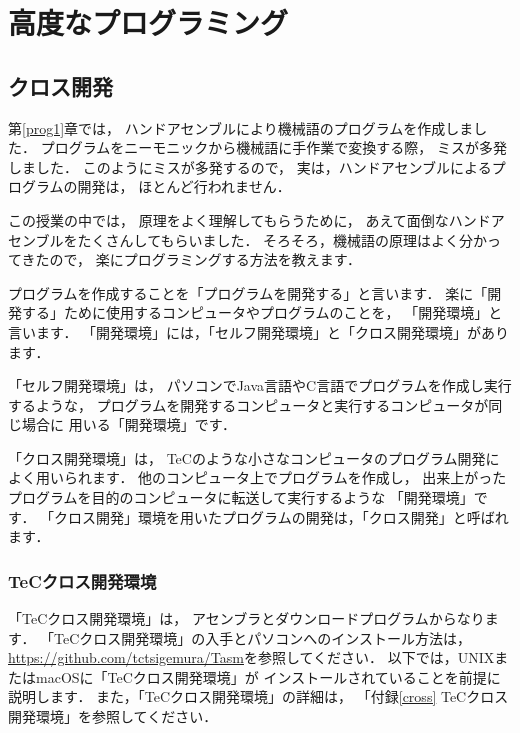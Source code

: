\renewcommand{\myincludegraphics}[2]{\texttt{[image: chap6/\#1]}}

\chapter{高度なプログラミング\label{prog2}}

\section{クロス開発}

第\ref{prog1}章では，
ハンドアセンブルにより機械語のプログラムを作成しました．
プログラムをニーモニックから機械語に手作業で変換する際，
ミスが多発しました．
このようにミスが多発するので，
実は，ハンドアセンブルによるプログラムの開発は，
ほとんど行われません．

この授業の中では，
原理をよく理解してもらうために，
あえて面倒なハンドアセンブルをたくさんしてもらいました．
そろそろ，機械語の原理はよく分かってきたので，
楽にプログラミングする方法を教えます．

プログラムを作成することを「プログラムを開発する」と言います．
楽に「開発する」ために使用するコンピュータやプログラムのことを，
「開発環境」と言います．
「開発環境」には，「セルフ開発環境」と「クロス開発環境」があります．

「セルフ開発環境」は，
パソコンでJava言語やC言語でプログラムを作成し実行するような，
プログラムを開発するコンピュータと実行するコンピュータが同じ場合に
用いる「開発環境」です．

「クロス開発環境」は，
TeCのような小さなコンピュータのプログラム開発によく用いられます．
他のコンピュータ上でプログラムを作成し，
出来上がったプログラムを目的のコンピュータに転送して実行するような
「開発環境」です．
「クロス開発」環境を用いたプログラムの開発は，「クロス開発」と呼ばれます．

\subsection{TeCクロス開発環境}
「TeCクロス開発環境」は，
アセンブラとダウンロードプログラムからなります．
「TeCクロス開発環境」の入手とパソコンへのインストール方法は，
\url{https://github.com/tctsigemura/Tasm}を参照してください．
以下では，UNIXまたはmacOSに「TeCクロス開発環境」が
インストールされていることを前提に説明します．
また，「TeCクロス開発環境」の詳細は，
「付録\ref{cross} TeCクロス開発環境」を参照してください．

